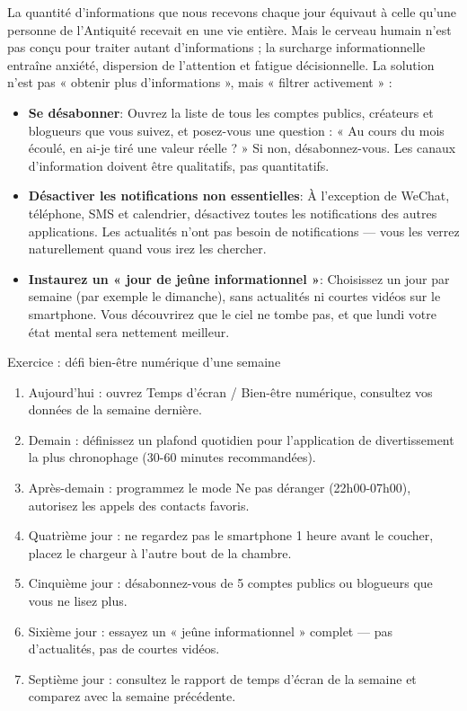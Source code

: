 
La quantité d'informations que nous recevons chaque jour équivaut à celle qu'une personne de l'Antiquité recevait en une vie entière. Mais le cerveau humain n'est pas conçu pour traiter autant d'informations ; la surcharge informationnelle entraîne anxiété, dispersion de l'attention et fatigue décisionnelle. La solution n'est pas « obtenir plus d'informations », mais « filtrer activement » :

\begin{itemize}
  \item \textbf{Se désabonner}: Ouvrez la liste de tous les comptes publics, créateurs et blogueurs que vous suivez, et posez-vous une question : « Au cours du mois écoulé, en ai-je tiré une valeur réelle ? » Si non, désabonnez-vous. Les canaux d'information doivent être qualitatifs, pas quantitatifs.
  \item \textbf{Désactiver les notifications non essentielles}: À l'exception de WeChat, téléphone, SMS et calendrier, désactivez toutes les notifications des autres applications. Les actualités n'ont pas besoin de notifications — vous les verrez naturellement quand vous irez les chercher.
  \item \textbf{Instaurez un « jour de jeûne informationnel »}: Choisissez un jour par semaine (par exemple le dimanche), sans actualités ni courtes vidéos sur le smartphone. Vous découvrirez que le ciel ne tombe pas, et que lundi votre état mental sera nettement meilleur.
\end{itemize}

\begin{tcbpractice}{Exercice : défi bien-être numérique d'une semaine}
\begin{enumerate}
  \item Aujourd'hui : ouvrez Temps d'écran / Bien-être numérique, consultez vos données de la semaine dernière.
  \item Demain : définissez un plafond quotidien pour l'application de divertissement la plus chronophage (30-60 minutes recommandées).
  \item Après-demain : programmez le mode Ne pas déranger (22h00-07h00), autorisez les appels des contacts favoris.
  \item Quatrième jour : ne regardez pas le smartphone 1 heure avant le coucher, placez le chargeur à l'autre bout de la chambre.
  \item Cinquième jour : désabonnez-vous de 5 comptes publics ou blogueurs que vous ne lisez plus.
  \item Sixième jour : essayez un « jeûne informationnel » complet — pas d'actualités, pas de courtes vidéos.
  \item Septième jour : consultez le rapport de temps d'écran de la semaine et comparez avec la semaine précédente.
\end{enumerate}

\end{tcbpractice}

